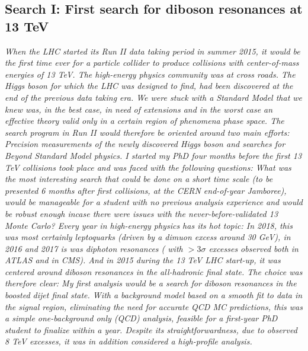 
\begin{centering}
\section*{Search I: First search for diboson resonances at 13 TeV}
\label{searchI}
\textit{
When the LHC started its Run II data taking period in summer 2015, it would be the first time ever for a particle collider to produce collisions with center-of-mass energies of 13 TeV. The high-energy physics community was at cross roads. The Higgs boson for which the LHC was designed to find, had been discovered at the end of the previous data taking era. We were stuck with a Standard Model that we knew was, in the best case, in need of extensions and in the worst case an effective theory valid only in a certain region of phenomena phase space. The search program in Run II would therefore be oriented around two main efforts: Precision measurements of the newly discovered Higgs boson and searches for Beyond Standard Model physics.
\newline
\newline
I started my PhD four months before the first 13 TeV collisions took place and was faced with the following questions:
What was the most interesting search that could be done on a short time scale (to be presented 6 months after first collisions, at the CERN end-of-year Jamboree), would be manageable for a student with no previous analysis experience and would be robust enough incase there were issues with the never-before-validated 13 \TeV Monte Carlo? \newline
\newline
Every year in high-energy physics has its hot topic: In 2018, this was most certainly leptoquarks (driven by a dimuon excess around 30 GeV), in 2016 and 2017 is was diphoton resonances ( with  $>3\sigma$ excesses observed both in ATLAS and in CMS). And in 2015 during the 13 TeV LHC start-up, it was centered around diboson resonances in the all-hadronic final state. The choice was therefore clear: My first analysis would be a search for diboson resonances in the boosted dijet final state. With a background model based on a smooth fit to data in the signal region, eliminating the need for accurate QCD MC predictions, this was a simple one-background only (QCD) analysis, feasible for a first-year PhD student to finalize within a year. Despite its straightforwardness, due to observed 8 TeV excesses, it was in addition considered a high-profile analysis.
\newline
}
\end{centering}
